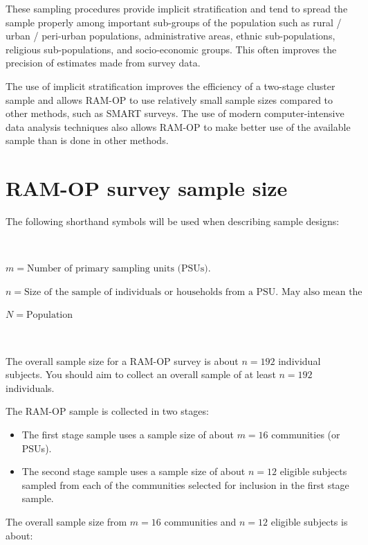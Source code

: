\documentclass[12pt,]{book}
\providecommand{\tightlist}{%
  \setlength{\itemsep}{0pt}\setlength{\parskip}{0pt}}
\theoremstyle{definition}
\theoremstyle{definition}
\theoremstyle{definition}
\theoremstyle{remark}
\begin{document}
These sampling procedures provide implicit stratification and tend to
spread the sample properly among important sub-groups of the population
such as rural / urban / peri-urban populations, administrative areas,
ethnic sub-populations, religious sub-populations, and socio-economic
groups. This often improves the precision of estimates made from survey
data.

The use of implicit stratification improves the efficiency of a
two-stage cluster sample and allows RAM-OP to use relatively small
sample sizes compared to other methods, such as SMART surveys. The use
of modern computer-intensive data analysis techniques also allows RAM-OP
to make better use of the available sample than is done in other
methods.

\hypertarget{ram-op-survey-sample-size}{%
\section{RAM-OP survey sample size}\label{ram-op-survey-sample-size}}

The following shorthand symbols will be used when describing sample
designs:

~

\(m = \text{Number of primary sampling units (PSUs).}\)

\(n = \text{Size of the sample of individuals or households from a PSU. May also mean the overall survey sample size (this meaning will be made clear in the text).}\)

\(N = \text{Population}\)

~

The overall sample size for a RAM-OP survey is about \(n = 192\)
individual subjects. You should aim to collect an overall sample of at
least \(n = 192\) individuals.

The RAM-OP sample is collected in two stages:

\begin{itemize}
\tightlist
\item
  The first stage sample uses a sample size of about \(m = 16\)
  communities (or PSUs).
\item
  The second stage sample uses a sample size of about \(n = 12\)
  eligible subjects sampled from each of the communities selected for
  inclusion in the first stage sample.
\end{itemize}

The overall sample size from \(m = 16\) communities and \(n = 12\)
eligible subjects is about:
\end{document}
